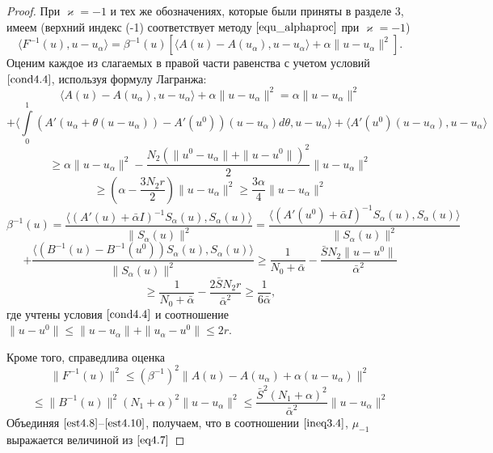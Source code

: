 \begin{proof} При $\varkappa=-1$ и тех же обозначениях, которые были приняты в разделе 3, имеем (верхний индекс (-1) соответствует методу $\eqref{equ_alphaproc}$ при $\varkappa=-1$)
$$\langle F^{-1}(u), u-u_\alpha\rangle=\beta ^{-1}(u)[\langle A(u)-A(u_\alpha), u-u_\alpha\rangle+\alpha\|u-u_\alpha\|^2].$$
Оценим каждое из слагаемых в правой части равенства с учетом условий $\eqref{cond4.4}$, используя формулу Лагранжа:
$$\langle A(u)-A(u_\alpha), u-u_\alpha\rangle+\alpha\|u-u_\alpha\|^2=\alpha\|u-u_\alpha\|^2$$ $$+\langle \int\limits_0^1 (A'(u_\alpha+\theta(u-u_\alpha))-A'(u^0))(u-u_\alpha)d\theta, u-u_\alpha\rangle+\langle A'(u^0)(u-u_\alpha), u-u_\alpha\rangle$$ $$\ge \alpha\|u-u_\alpha\|^2-\frac{N_2(\|u^0-u_\alpha\|+\|u-u^0\|)^2}{2}\|u-u_\alpha\|^2$$
\begin{equation}\label {est4.8}
\ge\left ( \alpha-\frac{3N_2 r}{2}\right )\|u-u_\alpha\|^2\ge\frac{3\alpha}{4}\|u-u_\alpha\|^2
\end{equation}
$$\beta ^{-1}(u)=\frac{\langle (A'(u)+\bar\alpha I)^{-1}S_\alpha(u), S_\alpha(u)\rangle}{\|S_\alpha(u)\|^2}=\frac{\langle (A'(u^0)+\bar\alpha I)^{-1}S_\alpha(u), S_\alpha(u)\rangle}{\|S_\alpha(u)\|^2}$$ $$+\frac{\langle (B^{-1}(u)-B^{-1}(u^0))S_\alpha(u), S_\alpha(u)\rangle}{\|S_\alpha(u)\|^2}\ge\frac{1}{N_0+\bar\alpha}-\frac{\bar S N_2\|u-u^0\|}{\bar\alpha^2}$$
\begin{equation}\label{est4.9}
\ge\frac{1}{N_0+\bar\alpha}-\frac{2\bar S N_2 r}{\bar\alpha^2}\ge\frac{1}{6\bar\alpha},
\end{equation}
где учтены условия $\eqref{cond4.4}$ и соотношение $\|u-u^0\|\le\|u-u_\alpha\|+\|u_\alpha-u^0\|\le 2r$.

Кроме того, справедлива оценка
$$\|F^{-1}(u)\|^2\le(\beta^{-1})^2\|A(u)-A(u_\alpha)+\alpha(u-u_\alpha)\|^2$$
\begin{equation}\label{est4.10}
\le\|B^{-1}(u)\|^2(N_1+\alpha)^2\|u-u_\alpha\|^2\le\frac{\bar S^2(N_1+\alpha)^2}{\bar\alpha^2}\|u-u_\alpha\|^2
\end{equation}
Объединяя $\eqref{est4.8}$--$\eqref{est4.10}$, получаем, что в соотношении $\eqref{ineq3.4}$, $\mu_{-1}$ выражается величиной из $\eqref{eq4.7}$


\end{proof}
